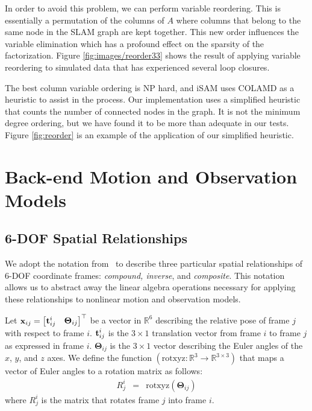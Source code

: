 \documentclass[conference]{IEEEtran}
\begin{document}
In order to avoid this problem, we can perform variable reordering. This is essentially a
permutation of the columns of $A$ where columns that belong to the same node in the SLAM
graph are kept together. This new order influences the variable elimination which
has a profound effect on the sparsity of the factorization. Figure
\ref{fig:images/reorder33} shows the result of applying variable reordering to simulated
data that has experienced several loop closures.

The best column variable ordering is NP hard, and iSAM uses COLAMD as a heuristic to
assist in the process. \cite{davis2004column} Our implementation uses a simplified
heuristic that counts the number of connected nodes in the graph. It is not the minimum
degree ordering, but we have found it to be more than adequate in our tests. Figure
\ref{fig:reorder} is an example of the application of our simplified heuristic.

\section{Back-end Motion and Observation Models}
\label{sec:backendModels}

\subsection{6-DOF Spatial Relationships}
\label{sec:6dof}

We adopt the notation from~\cite{rsmith-1990a,reustice-phdthesis} to
describe three particular spatial relationships of 6-DOF coordinate
frames: {\it compound, inverse}, and {\it composite}.  This notation
allows us to abstract away the linear algebra operations necessary for
applying these relationships to nonlinear motion and observation models.

Let ${\bf x}_{ij} = \begin{bmatrix}
  {\bf t}_{ij}^i & {\boldsymbol \Theta}_{ij}\\
\end{bmatrix}^\top$ be a vector in $\mathbb{R}^6$ describing the
relative pose of frame $j$ with respect to frame $i$.  ${\bf
  t}_{ij}^i$ is the $3\times 1$ translation vector from frame $i$ to
frame $j$ as expressed in frame $i$.  ${\boldsymbol \Theta}_{ij}$ is
the $3 \times 1$ vector describing the Euler angles of the $x$, $y$,
and $z$ axes.  We define the function $(\text{rotxyz}: \mathbb{R}^3
\rightarrow \mathbb{R}^{3\times3})$ that maps a vector of Euler angles to
a rotation matrix as follows:
\begin{eqnarray*}
  R_j^i & = & \text{rotxyz}({\boldsymbol \Theta}_{ij})
\end{eqnarray*}
where $R_j^i$ is the matrix that rotates frame $j$ into frame $i$.
\end{document}
